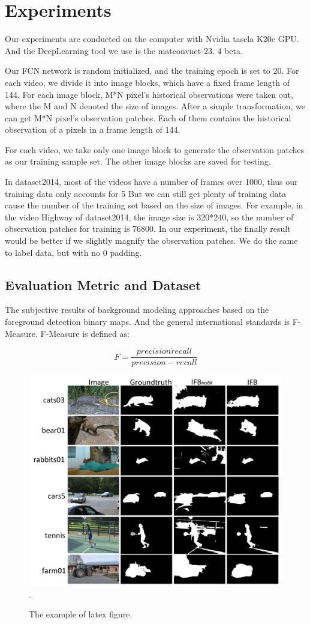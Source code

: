 \documentclass[journal]{IEEEtran}
\begin{document}
\section{Experiments}
Our experiments are conducted on the computer with Nvidia tasela K20c GPU.
 And the DeepLearning tool we use is the matconvnet-23.
4 beta.

Our FCN network is random initialized, and the training epoch is set to 20.
For each video, we divide it into image blocks, which have a fixed frame length of 144.
For each image block, M*N pixel’s historical observations were taken out, where the M and N denoted the size of images.
After a simple transformation, we can get M*N pixel’s observation patches.
Each of them contains the historical observation of a pixels in a frame length of 144.

For each video, we take only one image block to generate the observation patches as our training sample set.
The other image blocks are saved for testing.

In dataset2014, most of the videos have a number of frames over 1000, thus our training data only accounts for 5%
But we can still get plenty of training data cause the number of the training set based on the size of images.
For example, in the video Highway of dataset2014, the image size is 320*240, so the number of observation patches for training is 76800.
In our experiment, the finally result would be better if we slightly magnify the observation patches.
We do the same to label data, but with no 0 padding.

\subsection{Evaluation Metric and Dataset}
The subjective results of background modeling approaches based on the foreground detection binary maps.
And the general international standards is F-Measure.
F-Measure is defined as:

\begin{equation}
    F=\frac{precision \dot recall}{precision - recall}
\end{equation}
\begin{figure}[!t]	%
\centering
\includegraphics[width=.5\textwidth]{figure/fig_roc_fg}
\DeclareGraphicsExtensions.
    \caption{The example of latex figure.}
\label{fig_FBMS_nobk}
\end{figure}
\end{document}
